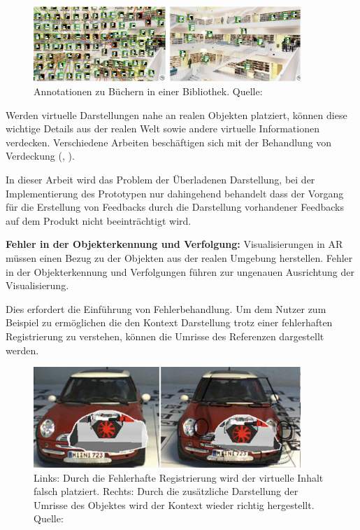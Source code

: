 \begin{figure}[H]
	\centering
	\includegraphics[width=0.9\textwidth]{resources/fundamentals/annotations_clutter.png}
	\caption{Annotationen zu Büchern in einer Bibliothek. Quelle: \cite[S.~1]{Tatzgern2016}}
	\label{img:annotation_clutter}
\end{figure}

Werden virtuelle Darstellungen nahe an realen Objekten platziert, können diese wichtige Details aus der realen Welt sowie andere virtuelle Informationen verdecken. 
Verschiedene Arbeiten beschäftigen sich mit der Behandlung von Verdeckung (\cite{Grasset2012}, \cite{Bell2001}).

In dieser Arbeit wird das Problem der Überladenen Darstellung, bei der Implementierung des Prototypen nur dahingehend behandelt dass der Vorgang für die Erstellung von 
Feedbacks durch die Darstellung vorhandener Feedbacks auf dem Produkt nicht beeinträchtigt wird. 

\textbf{Fehler in der Objekterkennung und Verfolgung:} Visualisierungen in AR müssen einen Bezug zu der Objekten aus der realen Umgebung herstellen. Fehler
in der Objekterkennung und Verfolgungen führen zur ungenauen Ausrichtung der Visualisierung.%

Dies erfordert die Einführung von Fehlerbehandlung. \cite[S.~243]{DieterSchmalstieg2016} Um dem Nutzer zum Beispiel zu ermöglichen die den Kontext Darstellung trotz einer fehlerhaften 
Registrierung zu verstehen, können die Umrisse des Referenzen dargestellt werden.

\begin{figure}[H]
	\centering
	\includegraphics[width=0.9\textwidth]{resources/fundamentals/missallignement.png}
	\caption{Links: Durch die Fehlerhafte Registrierung wird der virtuelle Inhalt falsch platziert. Rechts: Durch die zusätzliche Darstellung der Umrisse des Objektes wird der Kontext wieder richtig hergestellt. Quelle: \cite[S.~243]{DieterSchmalstieg2016}}
	\label{img:missallignement}
\end{figure}

